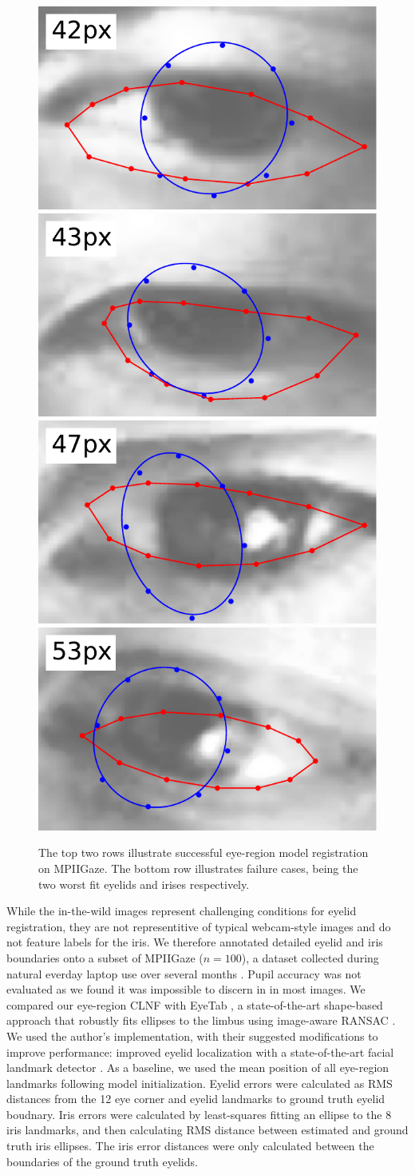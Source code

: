 \begin{figure}
    \par \vspace{0.1em}
    \includegraphics[width=0.244\columnwidth]{figs/ldmks_examples/idx_84.pdf}\hfill
    \includegraphics[width=0.244\columnwidth]{figs/ldmks_examples/idx_89.pdf}\hfill
    \includegraphics[width=0.244\columnwidth]{figs/ldmks_examples/idx_26.pdf}\hfill
    \includegraphics[width=0.244\columnwidth]{figs/ldmks_examples/idx_81.pdf}
    \caption{The top two rows illustrate successful eye-region model registration on MPIIGaze. The bottom row illustrates failure cases, being the two worst fit eyelids and irises respectively.}
    \label{fig:clnf_results}
\end{figure}

While the in-the-wild images represent challenging conditions for eyelid registration, they are not representitive of typical webcam-style images and do not feature labels for the iris.
We therefore annotated detailed eyelid and iris boundaries onto a subset of MPIIGaze ($n\!=\!100$), a dataset collected during natural everday laptop use over several months \cite{zhang15_cvpr}.
Pupil accuracy was not evaluated as we found it was impossible to discern in in most images.
We compared our eye-region CLNF with EyeTab \cite{wood2014eyetab}, a state-of-the-art shape-based approach that robustly fits ellipses to the limbus using image-aware RANSAC \cite{swirski2012robust}.
We used the author's implementation, with their suggested modifications to improve performance: improved eyelid localization with a state-of-the-art facial landmark detector \cite{baltrusaitis2013constrained}.
As a baseline, we used the mean position of all eye-region landmarks following model initialization.
Eyelid errors were calculated as RMS distances from the 12 eye corner and eyelid landmarks to ground truth eyelid boudnary.
Iris errors were calculated by least-squares fitting an ellipse to the 8 iris landmarks, and then calculating RMS distance between estimated and ground truth iris ellipses.
The iris error distances were only calculated between the boundaries of the ground truth eyelids.

